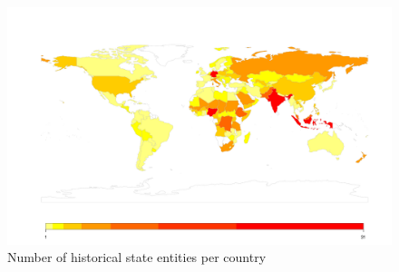 \begin{figure}[!htb]
	\includegraphics[width=\textwidth]{img/statesplot.pdf} 
	\caption{Number of historical state entities per country} 
	\label{Fig: ISDstates} 
\end{figure}
    
